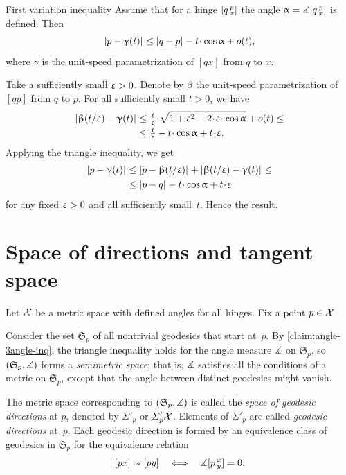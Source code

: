 \begin{thm}{First variation inequality}\label{lem:first-var}
Assume that for a  hinge $[q\,{}^{p}_{x}]$ 
the angle $\alpha\z=\mangle\hinge q p x$ is defined.
Then
\[\dist{p}{\gamma(t)}{}
\le
\dist{q}{p}{}-t\cdot \cos\alpha+o(t),\]
where $\gamma$ is the unit-speed parametrization of $[qx]$ from $q$ to $x$.
\end{thm}

 Take a sufficiently small $\upvarepsilon>0$.
Denote by $\beta$ the unit-speed parametrization of $[qp]$ from $q$ to $p$.
For all sufficiently small $t>0$, we have 
\begin{align*}
\dist{\beta(t/\eps)}{\gamma(t)}{}
&\le 
\tfrac{t}{\eps}\cdot \sqrt{1+\eps^2 -2\cdot \eps\cdot \cos\alpha}+o(t)\le
\\
&\le \tfrac{t}{\eps} -t\cdot \cos\alpha + t\cdot \eps.
\end{align*}
Applying the triangle inequality, we get 
\begin{align*}
\dist{p}{\gamma(t)}{}
&\le \dist{p}{\beta(t/\eps)}{}+\dist{\beta(t/\eps)}{\gamma(t)}{}
\le 
\\
&\le
\dist{p}{q}{} -t\cdot \cos\alpha + t\cdot \eps
\end{align*}
for any fixed $\upvarepsilon>0$ and all sufficiently small~$t$.
Hence the result.
\qeds

\section{Space of directions and tangent space}
\label{sec:tangent-space+directions}

Let $\mathcal{X}$ be a metric space with defined angles for all hinges.
Fix a point $p\in \spc{X}$. 

Consider the set $\mathfrak{S}_p$ 
of all nontrivial geodesics  that start at~$p$.
By \ref{claim:angle-3angle-inq}, the triangle inequality holds for the angle measure $\measuredangle$ on $\mathfrak{S}_p$,
so
 $(\mathfrak{S}_p,\measuredangle)$ 
forms a \emph{semimetric space};
that is, $\measuredangle$ satisfies all the conditions of a metric on $\mathfrak{S}_p$, except that  the angle between distinct geodesics might vanish.

The metric space corresponding to  $(\mathfrak{S}_p,\measuredangle)$ is called the \emph{space of geodesic directions} at $p$, denoted by $\Sigma'_p$ or $\varSigma'_p\mathcal{X}$.
Elements of $\Sigma'_p$ are called \emph{geodesic directions} at~$p$.
Each geodesic direction is formed by an equivalence class of geodesics in $\mathfrak{S}_p$
for the equivalence relation 
\[[px]\sim[py]\ \ \iff\ \ \mangle\hinge pxy=0.\]


